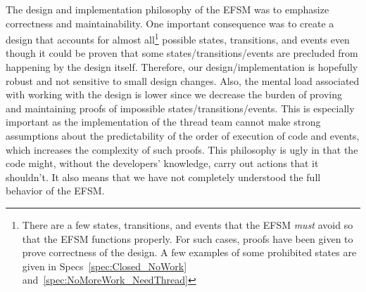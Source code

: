 \documentclass{article}
\begin{document}
The design and implementation philosophy of the EFSM was to emphasize
correctness and maintainability.  One important consequence was to create a
design that accounts for almost all\footnote{There are a few states,
transitions, and events that the EFSM \textit{must} avoid so that the EFSM
functions properly.  For such cases, proofs have been given to prove correctness
of the design.  A few examples of some prohibited states are given in
Specs~\ref{spec:Closed_NoWork} and~\ref{spec:NoMoreWork_NeedThread}} possible
states, transitions, and events even though it could be proven that some
states/transitions/events are precluded from happening by the design itself.
Therefore, our design/implementation is hopefully robust and not sensitive to
small design changes.  Also, the mental load associated with working with the
design is lower since we decrease the burden of proving and maintaining
proofs of impossible states/transitions/events.  This is especially important as
the implementation of the thread team cannot make strong assumptions about the
predictability of the order of execution of code and events, which increases the
complexity of such proofs.  This philosophy is ugly in that the code might,
without the developers' knowledge, carry out actions that it shouldn't.  It also
means that we have not completely understood the full behavior of the EFSM.\\
\end{document}
